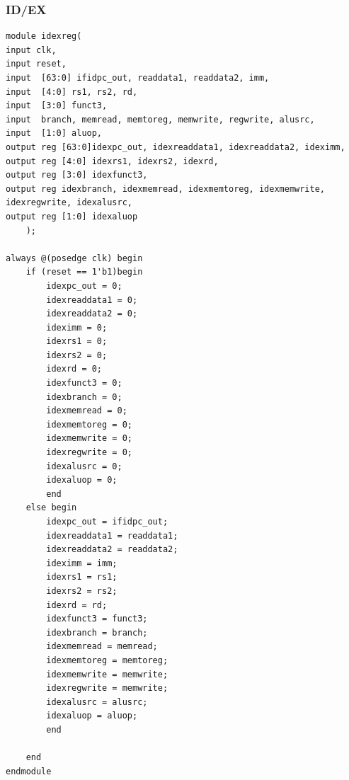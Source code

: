 \documentclass{article}
\begin{document}
\subsubsection{ID/EX}
\begin{lstlisting}[caption={Design Module for ID/EX}, captionpos=b, language=RISC-V]
module idexreg(
input clk,
input reset,
input  [63:0] ifidpc_out, readdata1, readdata2, imm,
input  [4:0] rs1, rs2, rd,
input  [3:0] funct3,
input  branch, memread, memtoreg, memwrite, regwrite, alusrc,
input  [1:0] aluop,
output reg [63:0]idexpc_out, idexreaddata1, idexreaddata2, ideximm,
output reg [4:0] idexrs1, idexrs2, idexrd,
output reg [3:0] idexfunct3,
output reg idexbranch, idexmemread, idexmemtoreg, idexmemwrite, idexregwrite, idexalusrc,
output reg [1:0] idexaluop
    );
    
always @(posedge clk) begin
    if (reset == 1'b1)begin
        idexpc_out = 0;
        idexreaddata1 = 0;
        idexreaddata2 = 0;
        ideximm = 0;
        idexrs1 = 0;
        idexrs2 = 0;
        idexrd = 0;
        idexfunct3 = 0;
        idexbranch = 0;
        idexmemread = 0;
        idexmemtoreg = 0;
        idexmemwrite = 0;
        idexregwrite = 0;
        idexalusrc = 0;
        idexaluop = 0;
        end
    else begin
        idexpc_out = ifidpc_out;
        idexreaddata1 = readdata1;
        idexreaddata2 = readdata2;
        ideximm = imm;
        idexrs1 = rs1;
        idexrs2 = rs2;
        idexrd = rd;
        idexfunct3 = funct3;
        idexbranch = branch;
        idexmemread = memread;
        idexmemtoreg = memtoreg;
        idexmemwrite = memwrite;
        idexregwrite = memwrite;
        idexalusrc = alusrc;
        idexaluop = aluop;
        end
        
    end
endmodule
\end{lstlisting}
\end{document}
